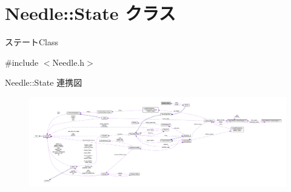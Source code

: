 \hypertarget{class_needle_1_1_state}{}\section{Needle\+:\+:State クラス}
\label{class_needle_1_1_state}


ステート\+Class  




{\ttfamily \#include $<$Needle.\+h$>$}



Needle\+:\+:State 連携図\nopagebreak
\begin{figure}[H]
\begin{center}
\leavevmode
\includegraphics[width=350pt]{class_needle_1_1_state__coll__graph}
\end{center}
\end{figure}
